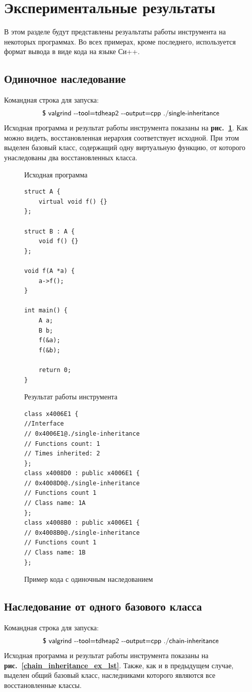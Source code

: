 \documentclass[a4paper,12pt,russian]{article}
\newcommand{\picref}[1]{\textbf{рис.~\ref{#1}}}
\newcommand{\code}[1]{\textsf{#1}}
\begin{document}
\newpage
\section{Экспериментальные результаты}
В этом разделе будут представлены резуальтаты работы инструмента на некоторых программах. Во всех примерах, кроме последнего, используется формат вывода в виде кода на языке Си++.

\subsection{Одиночное наследование}
Командная строка для запуска:
\[\mbox{\code{\$ valgrind -{}-tool=tdheap2 -{}-output=cpp ./single-inheritance}}\]
Исходная программа и результат работы инструмента показаны на \picref{single_inheritance_ex_lst}.
Как можно видеть, восстановленная иерархия соответствует исходной.
При этом выделен базовый класс, содержащий одну виртуальную функцию, от которого унаследованы два восстановленных класса.

\begin{figure}[h!]
\begin{minipage}[t]{0.45\linewidth}
\caption*{Исходная программа}
\begin{lstlisting}
struct A {
    virtual void f() {}
};

struct B : A {
    void f() {}
};

void f(A *a) {
    a->f();
}

int main() {
    A a;
    B b;
    f(&a);
    f(&b);

    return 0;
}
\end{lstlisting}
\end{minipage}
\begin{minipage}[t]{0.5\linewidth}
\caption*{Результат работы инструмента}
\begin{lstlisting}
class x4006E1 {
//Interface
// 0x4006E1@./single-inheritance
// Functions count: 1
// Times inherited: 2
};
class x4008D0 : public x4006E1 {
// 0x4008D0@./single-inheritance
// Functions count 1
// Class name: 1A
};
class x4008B0 : public x4006E1 {
// 0x4008B0@./single-inheritance
// Functions count 1
// Class name: 1B
};
\end{lstlisting}
\end{minipage}
\caption{Пример кода с одиночным наследованием}
\label{single_inheritance_ex_lst}
\end{figure}

\subsection{Наследование от одного базового класса}
Командная строка для запуска:
\[\mbox{\code{\$ valgrind -{}-tool=tdheap2 -{}-output=cpp ./chain-inheritance}}\]
Исходная программа и результат работы инструмента показаны на \picref{chain_inheritance_ex_lst}.
Также, как и в предыдущем случае, выделен общий базовый класс, наследниками которого являются все восстановленные классы.
\end{document}
